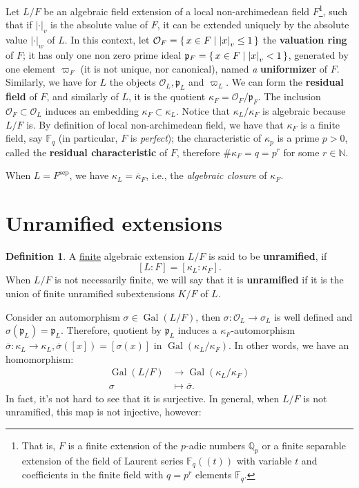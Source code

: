 \documentclass[12pt]{article}
\theoremstyle{plain}
\theoremstyle{definition}
\newtheorem{definition}[theorem]{Definition}
\newenvironment{Definition}{\colorlet{shadecolor}{Apricot!12} \begin{shaded} \begin{definition} }{ \end{definition} \end{shaded} }
\newcommand{\naturals}{\mathbb{N}}
\newcommand{\padics}{\mathbb{Q}_p}
\newcommand{\abs}[1]{\left \vert #1 \right \vert}
\renewcommand{\bar}[1]{\overline{#1}}
\newcommand{\Gal}[2]{\operatorname{Gal} ( #1 / #2 )}
\newcommand{\primo}[1]{\mathfrak{#1}}
\renewcommand{\O}{\mathcal{O}}
\newcommand{\sep}[1]{{#1}^{\operatorname{sep}}}
\begin{document}
Let $L/F$ be an algebraic field extension of a local non-archimedean field $F$\footnote{That is, $F$ is a finite extension of the $p$-adic numbers $\padics$ or a finite separable extension of the field of Laurent series $\mathbb{F}_q ((t))$ with variable $t$ and coefficients in the finite field with $q=p^r$ elements $\mathbb{F}_q$.}, such that if $\abs \cdot _v$ is the absolute value of $F$, it can be extended uniquely by the absolute value $\abs \cdot _w$ of $L$. In this context, let $\O_F = \set{x \in F | \abs x _v \leq 1}$ the \textbf{valuation ring} of $F$; it has only one non zero prime ideal $\primo p_{F} = \set{x \in F | \abs x _v < 1}$, generated by one element $\varpi_F$ (it is not unique, nor canonical), named \textit{a} \textbf{uniformizer} of $F$. Similarly, we have for $L$ the objects $\O_L, \primo p_L$ and $\varpi_L$. We can form the \textbf{residual field} of $F$, and similarly of $L$, it is the quotient $\kappa_F = \O_F / \primo p_F$. The inclusion $\O_F \subset \O_L$ induces an embedding $\kappa_F \subset \kappa_L$. Notice that $\kappa_L / \kappa_F$ is algebraic because $L/F$ is. By definition of local non-archimedean field, we have that $\kappa_F$ is a finite field, say $\mathbb{F}_q$ (in particular, $F$ is \textit{perfect}); the characteristic of $\kappa_p$ is a prime $p> 0$, called the \textbf{residual characteristic} of $F$, therefore $\# \kappa_F = q = p^r$ for some $r \in \naturals$.

When $L = \sep {F}$, we have $\kappa_L = \bar \kappa_F$, i.e., the \textit{algebraic closure} of $\kappa_F$.


\section{Unramified extensions}

\begin{Definition}
A \underline{finite} algebraic extension $L/F$ is said to be \textbf{unramified}, if
\[
    [L : F] = [\kappa_L : \kappa_F].
\]
When $L/F$ is not necessarily finite, we will say that it is \textbf{unramified} if it is the union of finite unramified subextensions $K/F$ of $L$.
\end{Definition}

Consider an automorphism $\sigma \in \Gal {L} F$, then $\sigma : \O_L \to \sigma_ L$ is well defined and $\sigma (\primo p _L) = \primo p _L$. Therefore, quotient by $\primo p _L$ induces a $\kappa_F$-automorphism $\bar \sigma : \kappa_L \to \kappa_L, \bar \sigma ([x]) = [\sigma (x)]$ in $\Gal {\kappa_L} {\kappa_F}$. In other words, we have an homomorphism:
\begin{align*}
\Gal L F &\longrightarrow \Gal {\kappa_L} {\kappa_F} \\
\sigma &\longmapsto \bar \sigma.
\end{align*}
In fact, it's not hard to see that it is surjective. In general, when $L/F$ is not unramified, this map is not injective, however:
\end{document}
